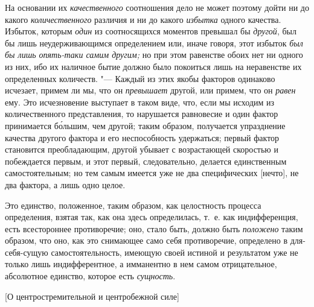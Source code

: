 На основании их {\em качественного} соотношения дело не
может поэтому дойти ни до какого {\em количественного}
различия и ни до какого {\em избытка} одного качества.
Избыток, которым {\em один} из соотносящихся моментов
превышал бы {\em другой}, был бы лишь неудерживающимся
определением или, иначе говоря, этот избыток {\em был
бы лишь опять-таки самим другим;} но при этом равенстве обоих нет ни одного
из них, ибо их наличное бытие должно было покоиться лишь на неравенстве их
определенных количеств. "--- Каждый из этих якобы факторов одинаково исчезает,
примем ли мы, что он {\em превышает} другой, или
примем, что он {\em равен} ему. Это исчезновение
выступает в таком виде, что, если мы исходим из количественного
представления, то нарушается равновесие и один фактор принимается б\'{о}льшим,
чем другой; таким образом, получается упразднение качества другого фактора
и его неспособность удержаться; первый фактор становится преобладающим,
другой убывает с возрастающей скоростью и побеждается первым, и этот
первый, следовательно, делается единственным самостоятельным; но тем самым
имеется уже не два специфических [нечто], не два фактора, а лишь одно
целое.

Это единство, положенное, таким образом, как целостность процесса
определения, взятая так, как она здесь определилась, т.~е. как
индифференция, есть всестороннее противоречие; оно, стало быть, должно быть
{\em положено} таким образом, что оно, как это
снимающее само себя противоречие, определено в для-себя-сущую
самостоятельность, имеющую своей истиной и результатом уже не только лишь
индифферентное, а имманентно в нем самом отрицательное, абсолютное единство,
которое есть {\em сущность}.

%
  {[О центростремительной и центробежной силе]}


